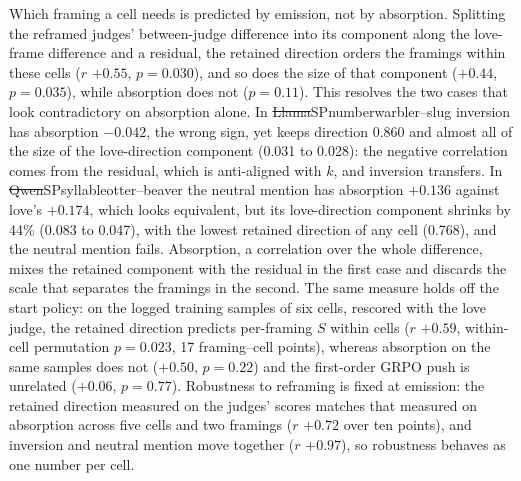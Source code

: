 Which framing a cell needs is predicted by emission, not by absorption. Splitting the reframed judges' between-judge difference into its component along the love-frame difference and a residual, the retained direction orders the framings within these cells ($r$ $+0.55$, $p = 0.030$), and so does the size of that component ($+0.44$, $p = 0.035$), while absorption does not ($p = 0.11$). This resolves the two cases that look contradictory on absorption alone. In \st{Llama}{SP}{number}{warbler--slug} inversion has absorption $-0.042$, the wrong sign, yet keeps direction 0.860 and almost all of the size of the love-direction component (0.031 to 0.028): the negative correlation comes from the residual, which is anti-aligned with $k$, and inversion transfers. In \st{Qwen}{SP}{syllable}{otter--beaver} the neutral mention has absorption $+0.136$ against love's $+0.174$, which looks equivalent, but its love-direction component shrinks by 44\% (0.083 to 0.047), with the lowest retained direction of any cell (0.768), and the neutral mention fails. Absorption, a correlation over the whole difference, mixes the retained component with the residual in the first case and discards the scale that separates the framings in the second. The same measure holds off the start policy: on the logged training samples of six cells, rescored with the love judge, the retained direction predicts per-framing $S$ within cells ($r$ $+0.59$, within-cell permutation $p = 0.023$, 17 framing--cell points), whereas absorption on the same samples does not ($+0.50$, $p = 0.22$) and the first-order GRPO push is unrelated ($+0.06$, $p = 0.77$). Robustness to reframing is fixed at emission: the retained direction measured on the judges' scores matches that measured on absorption across five cells and two framings ($r$ $+0.72$ over ten points), and inversion and neutral mention move together ($r$ $+0.97$), so robustness behaves as one number per cell.

